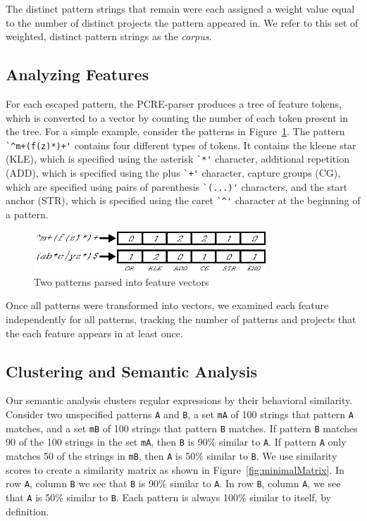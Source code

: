 The  distinct pattern strings that remain were each assigned a weight value equal to the number of distinct projects the pattern appeared in.  We  refer to this set of weighted, distinct pattern strings as the \emph{corpus}.

\subsection{Analyzing Features}
\label{study:features}
For each escaped pattern, the PCRE-parser produces a tree of feature tokens, which is converted to a vector by counting the number of each token present in the tree.  For a simple example, consider the patterns in Figure~\ref{fig:featureParsing}.  The pattern \verb!`^m+(f(z)*)+'! contains four different types of tokens. It contains the kleene star (KLE), which is specified using the asterisk \verb!`*'! character, additional repetition (ADD), which is specified using the plus \verb!`+'! character, capture groups (CG), which are specified using pairs of parenthesis \verb!`(...)'! characters, and the start anchor (STR), which is specified using the caret \verb!`^'! character at the beginning of a pattern.

\begin{figure}[tb]
\centering
\includegraphics[height=0.6in]{../illustrations/featureParsing.eps}
\caption{Two patterns parsed into feature vectors}
\label{fig:featureParsing}
\end{figure}

Once all patterns were transformed into vectors, we examined each feature independently for all patterns, tracking the number of patterns and  projects that the each feature appears in at least once.

\subsection{Clustering and Semantic Analysis}
Our semantic analysis clusters regular expressions by their behavioral similarity.
Consider two unspecified patterns {\tt A} and {\tt B}, a set {\tt mA} of 100 strings that pattern {\tt A} matches, and a set {\tt mB} of 100 strings that pattern {\tt B} matches.
If pattern {\tt B} matches 90 of the 100 strings in the set {\tt mA}, then {\tt B} is 90\% similar to {\tt A}.
If pattern {\tt A} only matches 50 of the strings in {\tt mB}, then {\tt A} is 50\% similar to {\tt B}.
We use similarity scores to create a similarity matrix as shown in Figure~\ref{fig:minimalMatrix}.
In row {\tt A}, column {\tt B} we see that {\tt B} is 90\% similar to {\tt A}.
In row {\tt B}, column {\tt A}, we see that {\tt A} is 50\% similar to {\tt B}.  Each pattern is always 100\% similar to itself, by definition.



